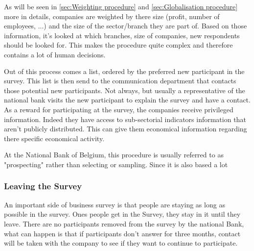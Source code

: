 \documentclass[12pt,a4paper,oneside]{book}
\begin{document}

As will be seen in \autoref{sec:Weighting procedure} and \autoref{sec:Globalisation procedure} more in details, companies are weighted by there size (profit, number of employees, ...) and the size of the sector/branch they are part of. 
Based on those information, it's looked at which branches, size of companies, new respondents should be looked for. 
This makes the procedure quite complex and therefore contains a lot of human decisions.
 
Out of this process comes a list, ordered by the preferred new participant in the survey. This list is then send to the communication department that contacts those potential new participants. 
Not always, but usually a representative of the national bank visits the new participant to explain the survey and have a contact.
As a reward for participating at the survey, the companies receive privileged information. Indeed they have access to sub-sectorial indicators information that aren't publicly distributed. This can give them economical information regarding there specific economical activity.

At the National Bank of Belgium, this procedure is usually referred to as "prospecting" rather than selecting or sampling. Since it is also based a lot 



\subsubsection{Leaving the Survey}

An important side of business survey is that people are staying as long as possible in the survey.
Ones  people get in the Survey, they stay in it until they leave. There are no participants removed from the survey by the national Bank, what can happen is that if participants don't answer for three months, contact will be taken with the company to see if they want to continue to participate.
\end{document}

